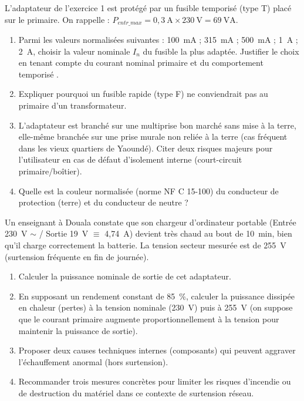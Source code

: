 \documentclass[11pt]{article}
\begin{document}
\begin{exercice}
L'adaptateur de l'exercice 1 est protégé par un fusible temporisé (type T) placé sur le primaire. On rappelle : $P_{entr\_max} = 0,3~\text{A} \times 230~\text{V} = 69~\text{VA}$.
\begin{enumerate}
    \item Parmi les valeurs normalisées suivantes : 100~mA ; 315~mA ; 500~mA ; 1~A ; 2~A, choisir la valeur nominale $I_n$ du fusible la plus adaptée. Justifier le choix en tenant compte du courant nominal primaire et du comportement \og{} temporisé \fg{}.
    \item Expliquer pourquoi un fusible \og{} rapide \fg{} (type F) ne conviendrait pas au primaire d'un transformateur.
    \item L'adaptateur est branché sur une multiprise bon marché sans mise à la terre, elle-même branchée sur une prise murale non reliée à la terre (cas fréquent dans les vieux quartiers de Yaoundé). Citer deux risques majeurs pour l'utilisateur en cas de défaut d'isolement interne (court-circuit primaire/boîtier).
    \item Quelle est la couleur normalisée (norme NF C 15-100) du conducteur de protection (terre) et du conducteur de neutre ?
\end{enumerate}
\end{exercice}

\begin{exercice}
Un enseignant à Douala constate que son chargeur d'ordinateur portable (Entrée 230~V $\sim$ / Sortie 19~V $\equiv$ 4,74~A) devient très chaud au bout de 10~min, bien qu'il charge correctement la batterie. La tension secteur mesurée est de 255~V (surtension fréquente en fin de journée).
\begin{enumerate}
    \item Calculer la puissance nominale de sortie de cet adaptateur.
    \item En supposant un rendement constant de 85~\%, calculer la puissance dissipée en chaleur (pertes) à la tension nominale (230~V) puis à 255~V (on suppose que le courant primaire augmente proportionnellement à la tension pour maintenir la puissance de sortie).
    \item Proposer deux causes techniques internes (composants) qui peuvent aggraver l'échauffement anormal (hors surtension).
    \item Recommander trois mesures concrètes pour limiter les risques d'incendie ou de destruction du matériel dans ce contexte de surtension réseau.
\end{enumerate}
\end{exercice}
\end{document}
